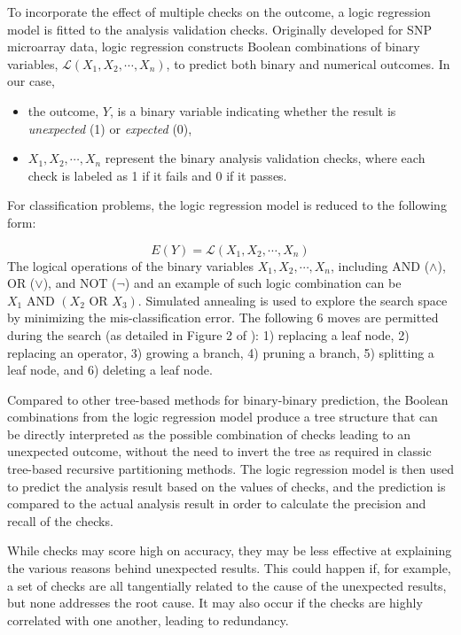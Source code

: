 \documentclass[
  12pt,
]{interact}
\providecommand{\tightlist}{%
  \setlength{\itemsep}{0pt}\setlength{\parskip}{0pt}}\usepackage{longtable,booktabs,array}
\begin{document}
To incorporate the effect of multiple checks on the outcome, a logic
regression model \citep{ruczinski_logic_2003} is fitted to the analysis
validation checks. Originally developed for SNP microarray data, logic
regression constructs Boolean combinations of binary variables,
\(\mathcal{L}(X_1, X_2, \cdots, X_n)\), to predict both binary and
numerical outcomes. In our case,

\begin{itemize}
\tightlist
\item
  the outcome, \(Y\), is a binary variable indicating whether the result
  is \emph{unexpected} (1) or \emph{expected} (0),
\item
  \(X_1, X_2, \cdots, X_n\) represent the binary analysis validation
  checks, where each check is labeled as 1 if it fails and 0 if it
  passes.
\end{itemize}

For classification problems, the logic regression model is reduced to
the following form:

\[E(Y) = \mathcal{L}(X_1, X_2, \cdots, X_n)\] The logical operations of
the binary variables \(X_1, X_2, \cdots, X_n\), including AND
(\(\land\)), OR (\(\lor\)), and NOT (\(\neg\)) and an example of such
logic combination can be \(X_1 \text{ AND } (X_2 \text{ OR } X_3)\).
Simulated annealing is used to explore the search space by minimizing
the mis-classification error. The following 6 moves are permitted during
the search (as detailed in Figure 2 of \citet{ruczinski_logic_2003}): 1)
replacing a leaf node, 2) replacing an operator, 3) growing a branch, 4)
pruning a branch, 5) splitting a leaf node, and 6) deleting a leaf node.

Compared to other tree-based methods for binary-binary prediction, the
Boolean combinations from the logic regression model produce a tree
structure that can be directly interpreted as the possible combination
of checks leading to an unexpected outcome, without the need to invert
the tree as required in classic tree-based recursive partitioning
methods. The logic regression model is then used to predict the analysis
result based on the values of checks, and the prediction is compared to
the actual analysis result in order to calculate the precision and
recall of the checks.

While checks may score high on accuracy, they may be less effective at
explaining the various reasons behind unexpected results. This could
happen if, for example, a set of checks are all tangentially related to
the cause of the unexpected results, but none addresses the root cause.
It may also occur if the checks are highly correlated with one another,
leading to redundancy.
\end{document}
